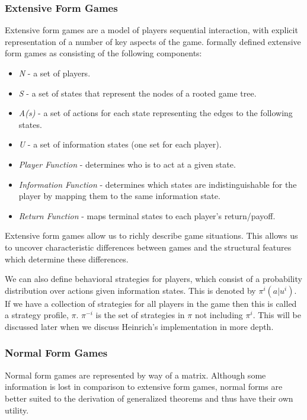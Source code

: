 \subsubsection{Extensive Form Games}
Extensive form games are a model of players sequential interaction, with explicit representation of a
number of key aspects of the game.
\citep{kuhn2016extensive} formally defined extensive form games as consisting of the following components:
\begin{itemize}
    \item \textit{N} - a set of players.
    \item \textit{S} - a set of states that represent the nodes of a rooted game tree.
    \item \textit{A(s)} - a set of actions for each state representing the edges to the following states.
    \item \textit{U} - a set of information states (one set for each player).
    \item \textit{Player Function} - determines who is to act at a given state.
    \item \textit{Information Function} - determines which states are indistinguishable for the player by mapping them to the same information state.
    \item \textit{Return Function} - maps terminal states to each player's return/payoff.
\end{itemize}

Extensive form games allow us to richly describe game situations.
This allows us to uncover characteristic differences between games and the structural features which
determine these differences\citep{kuhn2016extensive}.

We can also define behavioral strategies for players, which consist of a probability distribution over actions
given information states\citep{heinrich2017reinforcement}.
This is denoted by $\pi^i(a|u^i)$.
If we have a collection of strategies for all players in the game then this is called a strategy profile, $\pi$.
$\pi^{-i}$ is the set of strategies in $\pi$ not including $\pi^i$.
This will be discussed later when we discuss Heinrich's implementation in more depth.

\subsubsection{Normal Form Games}
Normal form games are represented by way of a matrix.
Although some information is lost in comparison to extensive form games, normal forms are
better suited to the derivation of generalized theorems\citep{kuhn2016extensive} and thus have their own utility.

